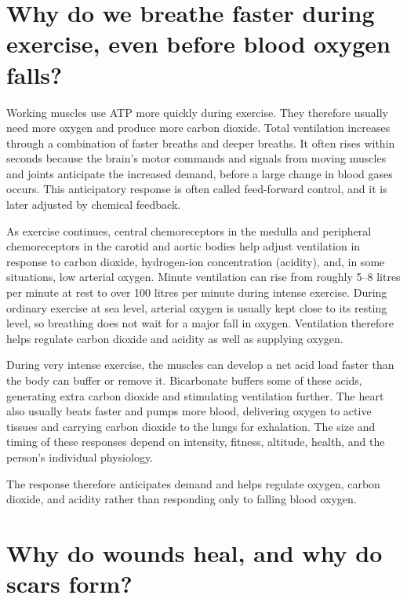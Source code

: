 \documentclass[11pt,oneside]{report}
\begin{document}
\section{Why do we breathe faster during exercise, even before blood oxygen falls?}

Working muscles use ATP more quickly during exercise. They therefore usually
need more oxygen and produce more carbon dioxide. Total ventilation increases
through a combination of faster breaths and deeper breaths. It often rises
within seconds because the brain's motor commands and signals from moving
muscles and joints anticipate the increased demand, before a large change in
blood gases occurs. This anticipatory response is often called feed-forward
control, and it is later adjusted by chemical feedback.

As exercise continues, central chemoreceptors in the medulla and peripheral
chemoreceptors in the carotid and aortic bodies help adjust ventilation in
response to carbon dioxide, hydrogen-ion concentration (acidity), and, in some
situations, low arterial oxygen. Minute ventilation can rise from roughly
5--8 litres per minute at rest to over 100 litres per minute during intense
exercise. During ordinary exercise at sea level, arterial oxygen is usually
kept close to its resting level, so breathing does not wait for a major fall in
oxygen. Ventilation therefore helps regulate carbon dioxide and acidity as well
as supplying oxygen.

During very intense exercise, the muscles can develop a net acid load faster
than the body can buffer or remove it. Bicarbonate buffers some of these acids,
generating extra
carbon dioxide and stimulating ventilation further. The heart also usually beats
faster and pumps more blood, delivering oxygen to active tissues and carrying
carbon dioxide to the lungs for exhalation. The size and timing of these
responses depend on intensity, fitness, altitude, health, and the person's
individual physiology.

The response therefore anticipates demand and helps regulate oxygen, carbon
dioxide, and acidity rather than responding only to falling blood oxygen.

\section{Why do wounds heal, and why do scars form?}
\end{document}
